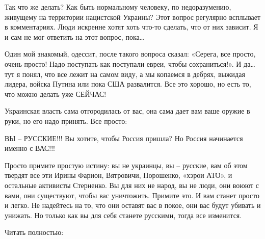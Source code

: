 Так что же делать? Как быть нормальному человеку, по недоразумению, живущему на территории нацистской Украины? Этот вопрос регулярно всплывает в комментариях. Люди искренне хотят хоть что-то сделать, что от них зависит. Я и сам не мог ответить на этот вопрос, пока…

Один мой знакомый, одессит, после такого вопроса сказал: «Серега, все просто, очень просто! Надо поступать как поступали евреи, чтобы сохраниться!». И да… тут я понял, что все лежит на самом виду, а мы копаемся в дебрях, выжидая лидера, войска Путина или пока США развалится. Все это хорошо, но есть то, что можно делать уже СЕЙЧАС!

Украинская власть сама отгородилась от вас, она сама дает вам ваше оружие в руки, но его надо принять. Все просто:

ВЫ – РУССКИЕ!!! Вы хотите, чтобы Россия пришла? Но Россия начинается именно с ВАС!!!

Просто примите простую истину: вы не украинцы, вы – русские, вам об этом твердят все эти Ирины Фарион, Вятровичи, Порошенко, «хэрои АТО», и остальные активисты Стерненко. Вы для них не народ, вы не люди, они воюют с вами, они существуют, чтобы вас уничтожить. Примите это. И вам станет просто и легко. Не надейтесь на то, что они оставят вас в покое, они вас будут убивать и унижать. Но только как вы для себя станете русскими, тогда все изменится.

Читать полностью: 
  
